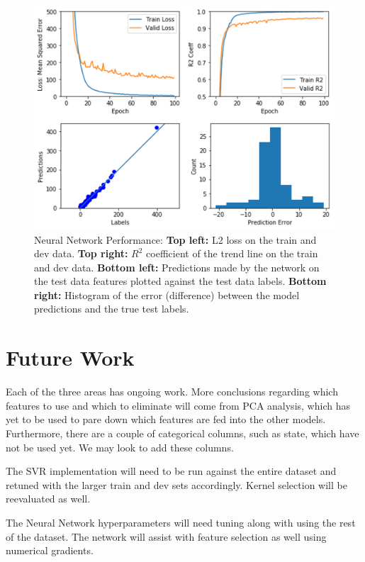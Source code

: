 \documentclass{article}
\begin{document}
	\begin{figure}[H]
		\centering
		\includegraphics[scale=0.4]{"NN_error_analysis"}
		\caption{Neural Network Performance: \textbf{Top left:} L2 loss on the train and dev data. \textbf{Top right:} $R^2$ coefficient of the trend line on the train and dev data. \textbf{Bottom left:} Predictions made by the network on the test data features plotted against the test data labels. \textbf{Bottom right:} Histogram of the error (difference) between the model predictions and the true test labels.}
		\label{fig:nn_perf}
	\end{figure}	
	
	
	\section{Future Work}
	Each of the three areas has ongoing work. More conclusions regarding which features to use and which to eliminate will come from PCA analysis, which has yet to be used to pare down which features are fed into the other models. Furthermore, there are a couple of categorical columns, such as state, which have not be used yet. We may look to add these columns.
	
	The SVR implementation will need to be run against the entire dataset and retuned with the larger train and dev sets accordingly. Kernel selection will be reevaluated as well.
	
	The Neural Network hyperparameters will need tuning along with using the rest of the dataset. The network will assist with feature selection as well using numerical gradients.
	
\end{document}
